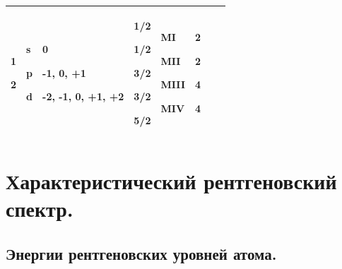 \documentclass[a4paper,14pt, openany, twoside, draft]{extbook} %
\begin{document}
\begin{flushleft}
\begin{supertabular}{|m{0.7cm}|m{1.9449999cm}|m{0.68cm}|m{1.726cm}|m{2.892cm}|m{1.04cm}|m{1.8499999cm}|m{2.504cm}|}
{ 1}

{ 2} &
{ s}

{ p}

{ d} &
{ 0}

{ {}-1, 0, +1}

{ {}-2, -1, 0, +1, +2} &
{ 1/2 }

{ 1/2}

{ 3/2}

{ 3/2}

{ 5/2 } &
{\centering{} MI\par}

{\centering{} MII\par}

{\centering{} MIII\par}

{\centering{} MIV\par}

{} &
{\centering{} 2\par}

{\centering{} 2\par}

{\centering{} 4\par}

{\centering{} 4\par}

{}\\\hline
\end{supertabular}
\end{flushleft}


\chapter{Характеристический рентгеновский спектр.}
\label{cha:character}

\section{Энергии рентгеновских уровней атома.}
\label{sec:rentgen-levels}
\end{document}
